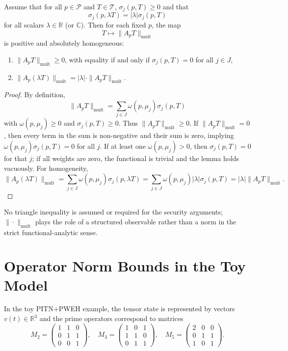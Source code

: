 \documentclass[11pt]{article}
\begin{document}
\begin{lemma}
Assume that for all \(p\in\mathcal{P}\) and \(T \in \mathcal{T}\),
\(\sigma_j(p,T) \ge 0\) and that
\[
  \sigma_j(p, \lambda T) = |\lambda| \sigma_j(p,T)
\]
for all scalars \(\lambda \in \mathbb{R}\) (or \(\mathbb{C}\)).
Then for each fixed \(p\), the map
\[
  T \mapsto \|A_p T\|_{\mathrm{mult}}
\]
is positive and absolutely homogeneous:
\begin{enumerate}[leftmargin=1.5em]
  \item \(\|A_p T\|_{\mathrm{mult}} \ge 0\), with equality if and only if \(\sigma_j(p,T) = 0\) for all \(j\in J\),
  \item \(\|A_p(\lambda T)\|_{\mathrm{mult}} = |\lambda|\cdot \|A_p T\|_{\mathrm{mult}}\).
\end{enumerate}
\end{lemma}

\begin{proof}
By definition,
\[
  \|A_p T\|_{\mathrm{mult}} = \sum_{j\in J} \omega(p,\mu_j)\sigma_j(p,T)
\]
with \(\omega(p,\mu_j)\ge 0\) and \(\sigma_j(p,T)\ge 0\).
Thus \(\|A_p T\|_{\mathrm{mult}} \ge 0\).
If \(\|A_p T\|_{\mathrm{mult}} = 0\), then every term in the sum is non-negative and their sum is zero, implying \(\omega(p,\mu_j)\sigma_j(p,T) = 0\) for all \(j\).
If at least one \(\omega(p,\mu_j) > 0\), then \(\sigma_j(p,T) = 0\) for that \(j\); if all weights are zero, the functional is trivial and the lemma holds vacuously.
For homogeneity,
\[
  \|A_p(\lambda T)\|_{\mathrm{mult}}
  = \sum_{j\in J} \omega(p,\mu_j)\sigma_j(p,\lambda T)
  = \sum_{j\in J} \omega(p,\mu_j) |\lambda|\sigma_j(p,T)
  = |\lambda| \|A_p T\|_{\mathrm{mult}}.
\]
\end{proof}

\begin{remark}
No triangle inequality is assumed or required for the security arguments; \(\|\cdot\|_{\mathrm{mult}}\) plays the role of a structured observable rather than a norm in the strict functional-analytic sense.
\end{remark}

\section{Operator Norm Bounds in the Toy Model}

In the toy PITN+PWEH example, the tensor state is represented by vectors \(v(t) \in \mathbb{R}^3\) and the prime operators correspond to matrices
\[
  M_2 =
  \begin{pmatrix}
  1 & 1 & 0 \\
  0 & 1 & 1 \\
  0 & 0 & 1
  \end{pmatrix},\quad
  M_3 =
  \begin{pmatrix}
  1 & 0 & 1 \\
  1 & 1 & 0 \\
  0 & 1 & 1
  \end{pmatrix},\quad
  M_5 =
  \begin{pmatrix}
  2 & 0 & 0 \\
  0 & 1 & 1 \\
  1 & 0 & 1
  \end{pmatrix}.
\]
\end{document}
